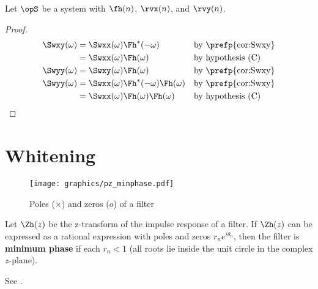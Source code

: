 \begin{corollary}
\label{cor:Swxy}
Let $\opS$ be a system with  $\fh(n)$,
 $\rvx(n)$, and  $\rvy(n)$.
\end{corollary}
\begin{proof}
\begin{align*}
   \Swxy(\omega)
     &= \Swxx(\omega) \Fh^\ast(-\omega)
     && \text{by \prefp{cor:Swxy}}
   \\&= \Swxx(\omega) \Fh(\omega)
     && \text{by hypothesis (C)}
   \\
   \Swyy(\omega)
     &= \Swxy(\omega) \Fh(\omega)
     && \text{by \prefp{cor:Swxy}}
   \\
   \Swyy(\omega)
     &= \Swxx(\omega) \Fh^\ast(-\omega) \Fh(\omega)
     && \text{by \prefp{cor:Swxy}}
   \\&= \Swxx(\omega) \Fh(\omega) \Fh(\omega)
     && \text{by hypothesis (C)}
\end{align*}
\end{proof}


\section{Whitening}
\label{sec:d-whiten}
\begin{figure}[h]
  \centering
  \texttt{[image: graphics/pz\_minphase.pdf]}
  \caption{
     Poles ($\times$) and zeros ($o$) of a  filter
     \label{fig:w_pz_minphase}
     }
\end{figure}
\begin{definition}
Let $\Zh(z)$ be the z-transform of the impulse response of a filter.
If $\Zh(z)$ can be expressed as a rational expression with poles and zeros
$r_ne^{i\theta_n}$,
then the filter is \textbf{minimum phase} if each $r_n<1$
(all roots lie inside the unit circle in the complex $z$-plane).
\end{definition}
See .

